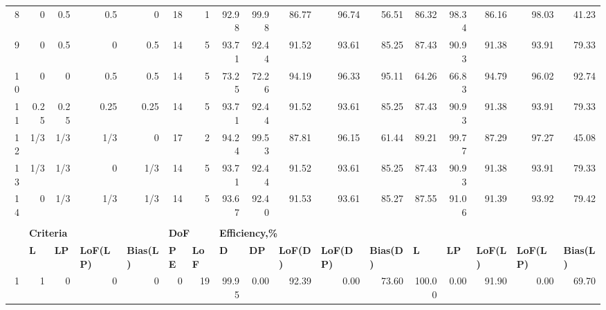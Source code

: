 \begin{landscape}
\begin{table}[p]
{\begin{tabular}{rrrrrrrrrrrrrrrrr}
8 & 0 & 0.5 & 0.5 & 0 & \multicolumn{1}{|r}{18} & 1 & \multicolumn{1}{|r}{92.98} & 99.98 & 86.77 & 96.74 & 56.51 & \multicolumn{1}{|r}{86.32} & 98.34 & 86.16 & 98.03 & 41.23 \\
9 & 0 & 0.5 & 0 & 0.5 & \multicolumn{1}{|r}{14} & 5 & \multicolumn{1}{|r}{93.71} & 92.44 & 91.52 & 93.61 & 85.25 & \multicolumn{1}{|r}{87.43} & 90.93 & 91.38 & 93.91 & 79.33 \\
10 & 0 & 0 & 0.5 & 0.5 & \multicolumn{1}{|r}{14} & 5 & \multicolumn{1}{|r}{73.25} & 72.26 & 94.19 & 96.33 & 95.11 & \multicolumn{1}{|r}{64.26} & 66.83 & 94.79 & 96.02 & 92.74 \\
11 & 0.25 & 0.25 & 0.25 & 0.25 & \multicolumn{1}{|r}{14} & 5 & \multicolumn{1}{|r}{93.71} & 92.44 & 91.52 & 93.61 & 85.25 & \multicolumn{1}{|r}{87.43} & 90.93 & 91.38 & 93.91 & 79.33 \\
12 & 1/3 & 1/3 & 1/3 & 0 & \multicolumn{1}{|r}{17} & 2 & \multicolumn{1}{|r}{94.24} & 99.53 & 87.81 & 96.15 & 61.44 & \multicolumn{1}{|r}{89.21} & 99.77 & 87.29 & 97.27 & 45.08 \\
13 & 1/3 & 1/3 & 0 & 1/3 & \multicolumn{1}{|r}{14} & 5 & \multicolumn{1}{|r}{93.71} & 92.44 & 91.52 & 93.61 & 85.25 & \multicolumn{1}{|r}{87.43} & 90.93 & 91.38 & 93.91 & 79.33 \\
14 & 0 & 1/3 & 1/3 & 1/3 & \multicolumn{1}{|r}{14} & 5 & \multicolumn{1}{|r}{93.67} & 92.40 & 91.53 & 93.61 & 85.27 & \multicolumn{1}{|r}{87.55} & 91.06 & 91.39 & 93.92 & 79.42 \\
 &  &  &  &  &  &  &  &  &  &  &  &  &  &  &  &  \\
\multicolumn{1}{l}{} & \multicolumn{4}{l}{{\bf Criteria}} & \multicolumn{2}{l}{{\bf DoF}} & \multicolumn{10}{l}{{\bf Efficiency,\%}} \\
\multicolumn{1}{l}{} & \multicolumn{1}{l}{{\bf L}} & \multicolumn{1}{l}{{\bf LP}} & \multicolumn{1}{l}{{\bf LoF(LP)}} & \multicolumn{1}{l}{{\bf Bias(L)}} & \multicolumn{1}{l}{{\bf PE}} & \multicolumn{1}{l}{{\bf LoF}} & \multicolumn{1}{l}{{\bf D}} & \multicolumn{1}{l}{{\bf DP}} & \multicolumn{1}{l}{{\bf LoF(D)}} & \multicolumn{1}{l}{{\bf LoF(DP)}} & \multicolumn{1}{l}{{\bf Bias(D)}} & \multicolumn{1}{l}{{\bf L}} & \multicolumn{1}{l}{{\bf LP}} & \multicolumn{1}{l}{{\bf LoF(L)}} & \multicolumn{1}{l}{{\bf LoF(LP)}} & \multicolumn{1}{l}{{\bf Bias(L)}} \\ 
1 & 1 & 0 & 0 & 0 & \multicolumn{1}{|r}{0} & 19 & \multicolumn{1}{|r}{99.95} & 0.00 & 92.39 & 0.00 & 73.60 & \multicolumn{1}{|r}{100.00} & 0.00 & 91.90 & 0.00 & 69.70 \\

\end{tabular}}
\end{table}
\end{landscape}
